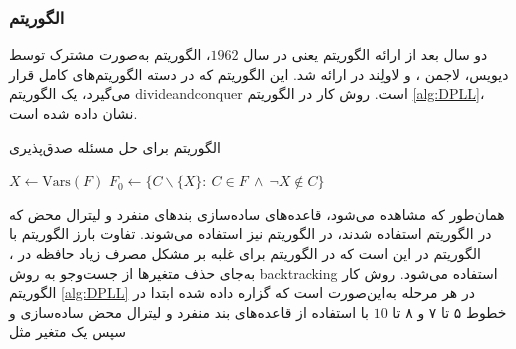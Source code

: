 \subsubsection*{الگوریتم  }
دو سال بعد  از ارائه الگوریتم 
یعنی در سال 
$1962$، 
الگوریتم 
به‌صورت مشترک توسط  
دیویس،  
لاجمن
، 
و لاولِند 
در  
\cite{davis1962machine}
ارائه شد.  این الگوریتم  که در دسته الگوریتم‌های کامل قرار می‌گیرد، یک الگوریتم 
\gls*{divideandconquer}
است.  روش کار  
در الگوریتم 
\ref{alg:DPLL}، 
نشان داده شده است. 
\begin{algorithm}
	\renewcommand{\algorithmicrequire}{\textbf{Input:}}
	\renewcommand{\algorithmicensure}{\textbf{Output:}}
	\caption{الگوریتم  
		برای حل مسئله صدق‌پذیری}
	\label{alg:DPLL}
	\begin{latin}
		\begin{algorithmic}[1]
			\ENDIF
			\ENDIF
			\ENDIF
			\STATE $X\gets \mathrm{Vars}(F) $\quad {}
			\STATE $F_{0}\gets \{C\backslash \{X\}: \ C\in F \ \wedge \ \neg X\notin C\}$
			\ENDIF
			\ENDIF			
			\EndFunction
		\end{algorithmic}
	\end{latin}
\end{algorithm}
همان‌طور که مشاهده می‌شود، قاعده‌های ساده‌سازی بندهای منفرد و لیترال محض که در الگوریتم 
استفاده شدند، در الگوریتم 
نیز استفاده  می‌شوند.  تفاوت بارز الگوریتم 
با الگوریتم 
در این است که در الگوریتم 
برای غلبه بر مشکل مصرف زیاد حافظه در 
، 
به‌جای حذف متغیرها از  جست‌وجو به روش 
\gls*{backtracking}
استفاده می‌شود.  روش کار الگوریتم 
\ref{alg:DPLL}
در هر مرحله به‌این‌صورت است که گزاره داده شده ابتدا در خطوط  ۵ تا ۷ و ۸ تا
$10$
  با استفاده از قاعده‌های بند منفرد  و لیترال محض ساده‌سازی  و سپس یک متغیر مثل 
